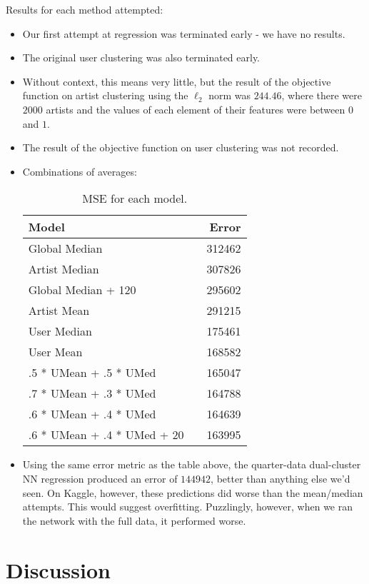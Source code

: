 \documentclass[11pt]{article}
\begin{document}
\noindent Results for each method attempted: 
\begin{itemize}
	\item Our first attempt at regression was terminated early - we have no results.
	\item The original user clustering was also terminated early.
	\item Without context, this means very little, but the result of the objective function on artist clustering using the $\ell_2$ norm was $244.46$, where there were $2000$ artists and the values of each element of their features were between $0$ and $1$.
	\item The result of the objective function on user clustering was not recorded.
	\item Combinations of averages:
	\begin{table}[h]
		\centering
		\begin{tabular}{llr}
			\toprule
			Model &  & Error \\
			\midrule
			Global Median & & 312462 \\
			Artist Median & & 307826 \\
			Global Median + 120 & & 295602 \\
			Artist Mean & & 291215\\
			User Median & & 175461  \\
			User Mean & &168582 \\
			.5 * UMean + .5 * UMed & & 165047 \\
			.7 * UMean + .3 * UMed & & 164788 \\
			.6 * UMean + .4 * UMed & & 164639 \\
			.6 * UMean + .4 * UMed + 20 & & 163995 \\
			\bottomrule
		\end{tabular}
		\caption{\label{tab:results} MSE for each model.}
	\end{table}

	\item Using the same error metric as the table above, the quarter-data dual-cluster NN regression produced an error of $144942$, better than anything else we'd seen. On Kaggle, however, these predictions did worse than the mean/median attempts. This would suggest overfitting. Puzzlingly, however, when we ran the network with the full data, it performed worse.
\end{itemize}


\section{Discussion} 
\end{document}
